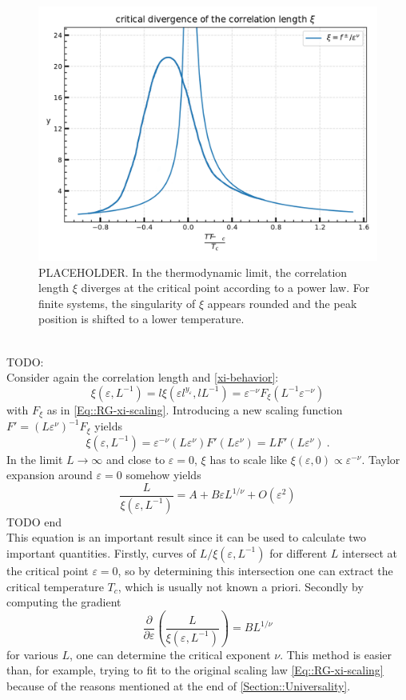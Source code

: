 	\begin{figure}[htp]
		\centering
		\includegraphics[width=0.7\linewidth]{graphics/xi-divergence-FS.png}
		\caption{PLACEHOLDER. In the thermodynamic limit, the correlation length $\xi$ diverges at the critical point according to a power law. For finite systems, the singularity of $\xi$ appears rounded and the peak position is shifted to a lower temperature.}
		\label{xi-divergence-FS}
	\end{figure} \\
	TODO: \\
	Consider again the correlation length and \autoref{xi-behavior}:
	\begin{equation}
		\xi(\varepsilon, L^{-1}) =	l \xi (\varepsilon l^{y_\varepsilon}, l L^{-1}) = \varepsilon^{-\nu} F_\xi (L^{-1} \varepsilon^{-\nu})
	\end{equation} 
	with $F_\xi$ as in \autoref{Eq::RG-xi-scaling}. Introducing a new scaling function $F' =	(L \varepsilon^\nu)^{-1} F_\xi$ yields
	\begin{equation}
		\xi(\varepsilon, L^{-1}) = \varepsilon^{-\nu} (L\varepsilon^\nu) F' (L \varepsilon^{\nu}) =	L	F'(L \varepsilon^\nu)~.	
	\end{equation}
	In the limit $L \rightarrow \infty$ and close to $\varepsilon =	0$, $\xi$ has to scale like $\xi(\varepsilon, 0) \propto \varepsilon^{-\nu}$. Taylor expansion around $\varepsilon =	0$ somehow yields
	\begin{equation} \label{Equation::FSS-Scaling-L/xi}
		\frac{L}{\xi(\varepsilon, L^{-1})} =	A + B \varepsilon L^{1/\nu} + O(\varepsilon^2)
	\end{equation}
	TODO end \\
	
	This equation is an important result since it can be used to calculate two important quantities. Firstly, curves of $L/\xi(\varepsilon, L^{-1})$ for different $L$ intersect at the critical point $\varepsilon = 0$, so by determining this intersection one can extract the critical temperature $T_c$, which is usually not known a priori. Secondly by computing the gradient
	\begin{equation}
		\frac{\partial}{\partial \varepsilon} \left(\frac{L}{\xi(\varepsilon, L^{-1})}\right) =	B L^{1/\nu}
	\end{equation}
	for various $L$, one can determine the critical exponent $\nu$. This method is easier than, for example, trying to fit to the original scaling law \autoref{Eq::RG-xi-scaling} because of the reasons mentioned at the end of \autoref{Section::Universality}.
